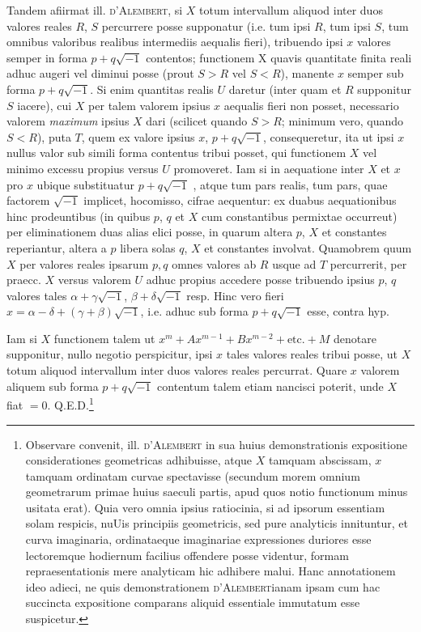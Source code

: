 \documentclass[14pt]{memoir}
\theoremstyle{plain}
\theoremstyle{remark}
\begin{document}
Tandem afiirmat ill. \textsc{d'Alembert}, si \(X\) totum intervallum aliquod inter duos valores reales \(R\), \(S\) percurrere posse supponatur (i.e. tum ipsi \(R\), tum ipsi \(S\), tum omnibus valoribus realibus intermediis aequalis fieri), tribuendo ipsi \(x\) valores semper in forma \(p+q\surd{-1}\)  contentos; functionem X quavis quantitate finita reali adhuc augeri vel diminui posse (prout \(S>R\) vel \(S<R\)), manente \(x\) semper sub forma \(p+q\surd{-1}\). Si enim quantitas realis \(U\) daretur (inter quam et \(R\) supponitur \(S\) iacere), cui \(X\) per talem valorem ipsius \(x\) aequalis fieri non posset, necessario valorem \textit{maximum} ipsius \(X\) dari (scilicet quando \(S>R\); minimum vero, quando \(S<R\)), puta \(T\), quem ex valore ipsius \(x\), \(p+q\surd{-1}\), consequeretur, ita ut ipsi \(x\) nullus valor sub simili forma contentus tribui posset, qui functionem \(X\) vel minimo excessu propius versus \(U\) promoveret. Iam si in aequatione inter \(X\) et \(x\) pro \(x\) ubique substituatur \(p+q\surd{-1}\) , atque tum pars realis, tum pars, quae factorem \(\surd{-1}\) implicet, hocomisso, cifrae aequentur: ex duabus aequationibus hinc prodeuntibus (in quibus \(p\), \(q\) et \(X\) cum constantibus permixtae occurreut) per eliminationem duas alias elici posse, in quarum altera \(p\), \(X\) et constantes reperiantur, altera a \(p\) libera solas \(q\), \(X\) et constantes involvat. Quamobrem quum \(X\) per valores reales ipsarum \(p, q\) omnes valores ab \(R\) usque ad \(T\) percurrerit, per praecc. \(X\) versus valorem \(U\) adhuc propius accedere posse tribuendo ipsius \(p\), \(q\) valores tales \(\alpha + \gamma \surd{-1}\), \(\beta + \delta\surd{-1}\) resp. Hinc vero fieri \(x = \alpha - \delta + (\gamma + \beta)\surd{-1}\), i.e. adhuc sub forma \(p+q\surd{-1}\) esse, contra hyp.

Iam si \(X\) functionem talem ut \(x^m + A x^{m-1} + B x^{m-2} + \text{etc.} + M\) denotare supponitur, nullo negotio perspicitur, ipsi \(x\) tales valores reales tribui posse, ut \(X\) totum aliquod intervallum inter duos valores reales percurrat. Quare \(x\) valorem aliquem sub forma \(p+q\surd{-1}\) contentum talem etiam nancisci poterit, unde \(X\) fiat \(=0\).   Q.E.D.\footnote{Observare convenit, ill. \textsc{d'Alembert} in sua huius demonstrationis expositione considerationes geometricas adhibuisse, atque \(X\) tamquam abscissam, \(x\) tamquam ordinatam curvae spectavisse (secundum morem omnium geometrarum primae huius saeculi partis, apud quos notio functionum minus usitata erat). Quia vero omnia ipsius ratiocinia, si ad ipsorum essentiam solam respicis, nuUis principiis geometricis, sed pure analyticis innituntur, et curva imaginaria, ordinataeque imaginariae expressiones duriores esse lectoremque hodiernum facilius offendere posse videntur, formam repraesentationis mere analyticam hic adhibere malui. Hanc annotationem ideo adieci, ne quis demonstrationem \textsc{d'Alembert}ianam ipsam cum hac succincta expositione comparans aliquid essentiale immutatum esse suspicetur.}
\end{document}
